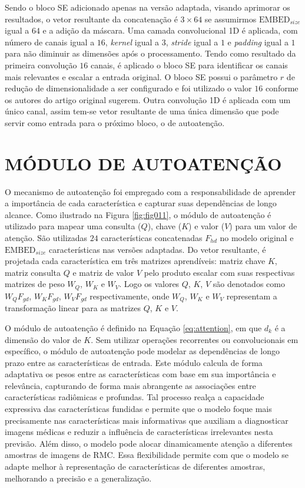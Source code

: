 Sendo o bloco \gls{SE} adicionado apenas na versão adaptada, visando aprimorar os resultados, o vetor resultante da concatenação é $3\times64$ se assumirmos $\text{EMBED}_{size}$ igual a $64$ e a adição da máscara. Uma camada convolucional 1D é aplicada, com número de canais igual a $16$, \textit{kernel} igual a 3, \textit{stride} igual a $1$ e \textit{padding} igual a $1$ para não diminuir as dimensões após o processamento. Tendo como resultado da primeira convolução $16$ canais, é aplicado o bloco \gls{SE} para identificar os canais mais relevantes e escalar a entrada original. O bloco \gls{SE} possui o parâmetro $r$ de redução de dimensionalidade a ser configurado e foi utilizado o valor $16$ conforme os autores do artigo original sugerem. Outra convolução 1D é aplicada com um único canal, assim tem-se vetor resultante de uma única dimensão que pode servir como entrada para o próximo bloco, o de autoatenção.

\section{MÓDULO DE AUTOATENÇÃO}
\label{subsec:cap4_mod_self_attnn}

O mecanismo de autoatenção foi empregado com a responsabilidade de aprender a importância de cada característica e capturar suas dependências de longo alcance. Como ilustrado na Figura \ref{fig:fig011}, o módulo de autoatenção é utilizado para mapear uma consulta ($Q$), chave ($K$) e valor ($V$) para um valor de atenção. São utilizadas $24$ características concatenadas $F_{hd}$ no modelo original e $\text{EMBED}_{size}$ características nas versões adaptadas. Do vetor resultante, é projetada cada característica em três matrizes aprendíveis: matriz chave $K$, matriz consulta $Q$ e matriz de valor $V$ pelo produto escalar com suas respectivas matrizes de peso $W_{Q}$, $W_{K}$ e $W_{V}$. Logo os valores $Q$, $K$, $V$ são denotados como $W_{Q}F_{gd}$, $W_{K}F_{gd}$, $W_{V}F_{gd}$ respectivamente, onde $W_{Q}$, $W_{K}$ e $W_{V}$ representam a transformação linear para as matrizes $Q$, $K$ e $V$. 

O módulo de autoatenção é definido na Equação \ref{eq:attention}, em que $d_{k}$ é a dimensão do valor de $K$. Sem utilizar operações recorrentes ou convolucionais em específico, o módulo de autoatenção pode modelar as dependências de longo prazo entre as características de entrada.
Este módulo calcula de forma adaptativa os pesos entre as características com base em sua importância e relevância, capturando de forma mais abrangente as associações entre características radiômicas e profundas. Tal processo realça a capacidade expressiva das características fundidas e permite que o modelo foque mais precisamente nas características mais informativas que auxiliam a diagnosticar imagens médicas e reduzir a influência de características irrelevantes nesta previsão. Além disso, o modelo pode alocar dinamicamente atenção a diferentes amostras de imagens de \gls{RMC}. Essa flexibilidade permite com que o modelo se adapte melhor à representação de características de diferentes amostras, melhorando a precisão e a generalização.

